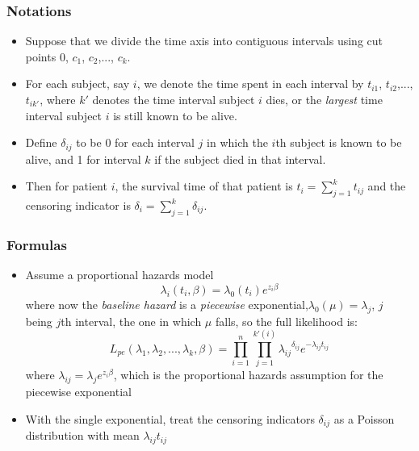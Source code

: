 \documentclass{beamer}
\newcommand{\empr}[1]{{\emph{\color{red}#1}}}
\begin{document}
\pagebreak
\begin{frame}
\frametitle{Notations}
\begin{itemize}
\item Suppose that we divide the time axis into contiguous intervals using cut points 0, $c_1$, $c_2$,..., $c_k$.
\item For each subject, say $i$, we denote the time spent in each interval by $t_{i1}$, $t_{i2}$,...,$t_{ik'}$, where $k'$ denotes the time interval subject $i$ dies, or the \empr{largest} time interval subject $i$ is still known to be alive.
\item Define $\delta_{ij}$ to be 0 for each interval $j$ in which the $i$th subject is known to be alive, and 1 for interval $k$ if the subject died in that interval.
\item Then for patient $i$, the survival time of that patient is $t_i = \sum_{j=1}^{k}t_{ij}$ and the censoring indicator is $\delta_i =\sum_{j=1}^{k}\delta_{ij}$.
\end{itemize}
\end{frame}

\pagebreak
\begin{frame}
\frametitle{Formulas}
\begin{itemize}
\item Assume a proportional hazards model
\begin{equation}
\lambda_i(t_i, \beta) = \lambda_0(t_i)e^{z_i\beta}
\end{equation}
where now the \empr{baseline hazard} is a \empr{piecewise} exponential,$\lambda_0(\mu)=\lambda_j$, $j$ being $j$th interval, the one in which $\mu$ falls, so the full likelihood is:
\begin{equation}
L_{pe}(\lambda_1, \lambda_2,...,\lambda_k,\beta) = \prod\limits_{i=1}^{n}\prod\limits_{j=1}^{k'(i)}{\lambda_{ij}}^{\delta_{ij}}e^{-\lambda_{ij} t_{ij}}
\end{equation}
where $\lambda_{ij} = \lambda_j e^{z_i\beta}$, which is the proportional hazards assumption for the piecewise exponential
\item With the single exponential, treat the censoring indicators $\delta_{ij}$ as a Poisson distribution with mean $\lambda_{ij}t_{ij}$
\end{itemize}
\end{frame}
\end{document}
